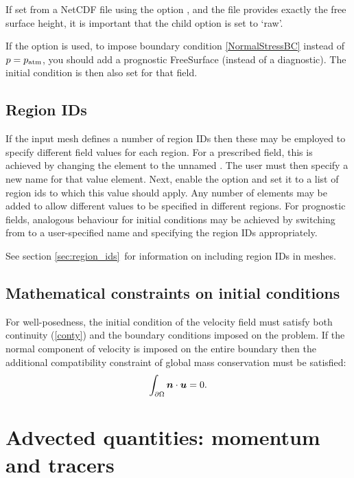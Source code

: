 If set from a NetCDF file using the option , and the file provides exactly the
free surface height, it is important that the child option  is set to `raw'.

If the  option is used, to impose
boundary condition \eqref{NormalStressBC} instead of $p=p_{\text{atm}}$, you should add a
prognostic FreeSurface (instead of a diagnostic). The initial condition is then
also set for that field.

\subsection{Region IDs}
If the input mesh defines a number of region IDs then these may be employed
to specify different field values for each region. For a prescribed field,
this is achieved by changing the  element to
the unnamed . The user must then specify a new name for
that value element. Next, enable the  
option and set it to a list of region ids to which this value should
apply. Any number of   elements may be added to allow
different values to be specified in different regions. For prognostic
fields, analogous behaviour for initial conditions may be achieved by
switching  from  to a
user-specified name and specifying the region IDs appropriately.

See section \ref{sec:region_ids}\ for information on including region IDs
in meshes.

\subsection{Mathematical constraints on initial conditions}\label{sec:ICs}

For well-posedness, the initial condition of the velocity field must
satisfy both continuity (\ref{conty}) and the boundary conditions
imposed on the problem. If the normal component of velocity is
imposed on the entire boundary then the additional
compatibility constraint of global mass conservation must be
satisfied:
\begin{equation*}
\int_{\partial\Omega}{\mbox{\boldmath$n$}}\cdot{\mbox{\boldmath$u$}}=0.
\end{equation*}

\section{Advected quantities: momentum and tracers}
\label{config:spatial}

